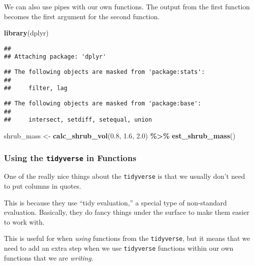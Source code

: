 \documentclass[
]{article}
\newenvironment{Shaded}{\begin{snugshade}}{\end{snugshade}}
\newcommand{\FloatTok}[1]{\textcolor[rgb]{0.00,0.00,0.81}{#1}}
\newcommand{\FunctionTok}[1]{\textcolor[rgb]{0.13,0.29,0.53}{\textbf{#1}}}
\newcommand{\NormalTok}[1]{#1}
\newcommand{\OtherTok}[1]{\textcolor[rgb]{0.56,0.35,0.01}{#1}}
\newcommand{\SpecialCharTok}[1]{\textcolor[rgb]{0.81,0.36,0.00}{\textbf{#1}}}
\begin{document}
We can also use pipes with our own functions. The output from the first
function becomes the first argument for the second function.

\begin{Shaded}
\begin{Highlighting}[]
\FunctionTok{library}\NormalTok{(dplyr)}
\end{Highlighting}
\end{Shaded}

\begin{verbatim}
## 
## Attaching package: 'dplyr'
\end{verbatim}

\begin{verbatim}
## The following objects are masked from 'package:stats':
## 
##     filter, lag
\end{verbatim}

\begin{verbatim}
## The following objects are masked from 'package:base':
## 
##     intersect, setdiff, setequal, union
\end{verbatim}

\begin{Shaded}
\begin{Highlighting}[]
\NormalTok{shrub\_mass }\OtherTok{\textless{}{-}} \FunctionTok{calc\_shrub\_vol}\NormalTok{(}\FloatTok{0.8}\NormalTok{, }\FloatTok{1.6}\NormalTok{, }\FloatTok{2.0}\NormalTok{) }\SpecialCharTok{\%\textgreater{}\%} 
  \FunctionTok{est\_shrub\_mass}\NormalTok{()}
\end{Highlighting}
\end{Shaded}

\hypertarget{using-the-tidyverse-in-functions}{%
\subsubsection{\texorpdfstring{Using the \texttt{tidyverse} in
Functions}{Using the tidyverse in Functions}}\label{using-the-tidyverse-in-functions}}

One of the really nice things about the \texttt{tidyverse} is that we
usually don't need to put columns in quotes.

This is because they use ``tidy evaluation,'' a special type of
non-standard evaluation. Basically, they do fancy things under the
surface to make them easier to work with.

This is useful for when \emph{using} functions from the
\texttt{tidyverse}, but it means that we need to add an extra step when
we use \texttt{tidyverse} functions within our own functions that we are
\emph{writing}.
\end{document}
